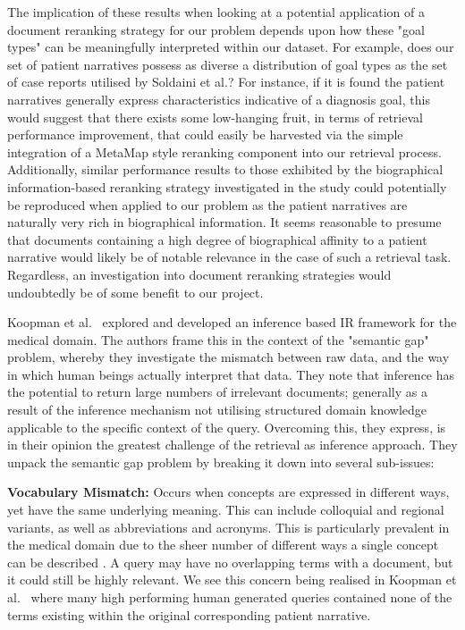 \documentclass[a4paper]{report}
\begin{document}
The implication of these results when looking at a potential application of a document reranking strategy for our problem depends upon how these "goal types" can be meaningfully interpreted within our dataset. For example, does our set of patient narratives possess as diverse a distribution of goal types as the set of case reports utilised by Soldaini et al.? For instance, if it is found the patient narratives generally express characteristics indicative of a diagnosis goal, this would suggest that there exists some low-hanging fruit, in terms of retrieval performance improvement, that could easily be harvested via the simple integration of a MetaMap style reranking component into our retrieval process. Additionally, similar performance results to those exhibited by the biographical information-based reranking strategy investigated in the study could potentially be reproduced when applied to our problem as the patient narratives are naturally very rich in biographical information. It seems reasonable to presume that documents containing a high degree of biographical affinity to a patient narrative would likely be of notable relevance in the case of such a retrieval task. Regardless, an investigation into document reranking strategies would undoubtedly be of some benefit to our project.


Koopman et al.~\cite{Koopman2015Information-Ret} explored and developed an inference based IR framework for the medical domain. The authors frame this in the context of the "semantic gap" problem, whereby they investigate the mismatch between raw data, and the way in which human beings actually interpret that data. They note that inference has the potential to return large numbers of irrelevant documents; generally as a result of the inference mechanism not utilising structured domain knowledge  applicable to the specific context of the query. Overcoming this, they express, is in their opinion the greatest challenge of the retrieval as inference approach. They unpack the semantic gap problem by breaking it down into several sub-issues:

\textbf{Vocabulary Mismatch:}
Occurs when concepts are expressed in different ways, yet have the same underlying meaning. This can include colloquial and regional variants, as well as abbreviations and acronyms. This is particularly prevalent in the medical domain due to the sheer number of different ways a single concept can be described \cite{quteprints72853}. A query may have no overlapping terms with a document, but it could still be highly relevant. We see this concern being realised in Koopman et al.~\cite{koopman2017generating} where many high performing human generated queries contained none of the terms existing within the original corresponding patient narrative.
  
\end{document}
